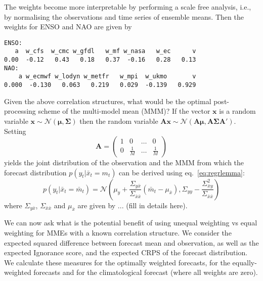 \documentclass[12pt]{article}
\renewcommand{\vec}[1]{\bm{#1}}
\newcommand{\mat}[1]{\bm{#1}}
\begin{document}
The weights become more interpretable by performing a scale free analysis, i.e., by normalising the observations and time series of ensemble means.
Then the weights for ENSO and NAO are given by
\begin{verbatim}
ENSO:
   a  w_cfs  w_cmc w_gfdl   w_mf w_nasa   w_ec      v 
0.00  -0.12   0.43   0.18   0.37  -0.16   0.28   0.13 
NAO:
    a w_ecmwf w_lodyn w_metfr   w_mpi  w_ukmo       v 
0.000  -0.130   0.063   0.219   0.029  -0.139   0.929 
\end{verbatim}

Given the above correlation structures, what would be the optimal post-processing scheme of the multi-model mean (MMM)?
If the vector $\vec{x}$ is a random variable $\vec{x}\sim \mathcal{N}(\vec{\mu}, \mat{\Sigma})$ then the random variable $\mat{A}\vec{x} \sim \mathcal{N}(\mat{A}\vec{\mu}, \mat{A}\mat{\Sigma}\mat{A}')$.
Setting
%
\begin{equation}
\mat{A} = \left(\begin{matrix} 1 & 0 & \dots & 0 \\ 0 & \frac1M & \dots & \frac1M\end{matrix}\right)
\end{equation}
%
yields the joint distribution of the observation and the MMM from which the forecast distribution $p(y_t | \bar{x}_t = m_t)$ can be derived using eq.~\ref{eq:regrlemma}:
%
\begin{equation}
p(y_t|\bar{x}_t = \bar{m}_t) = \mathcal{N}\left(\mu_y + \frac{\Sigma_{y\bar{x}}}{\Sigma_{\bar{x}\bar{x}}} (\bar{m}_t - \mu_{\bar{x}}), \Sigma_{yy} - \frac{\Sigma_{\bar{x}y}^2}{\Sigma_{\bar{x}\bar{x}}}\right)
\end{equation}
%
where $\Sigma_{y\bar{x}}$, $\Sigma_{\bar{x}\bar{x}}$ and $\mu_{\bar{x}}$ are given by ... (fill in details here).

We can now ask what is the potential benefit of using unequal weighting vs equal weighting for MMEs with a known correlation structure.
We consider the expected squared difference between forecast mean and observation, as well as the expected Ignorance score, and the expected CRPS of the forecast distribution.
We calculate these measures for the optimally weighted forecasts, for the equally-weighted forecasts and for the climatological forecast (where all weights are zero).
\end{document}
